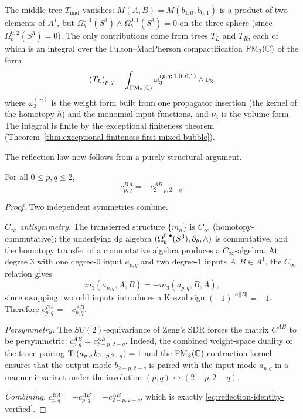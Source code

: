 The middle tree $T_{\mathrm{mid}}$ vanishes: $M(A,B)=M(b_{1,0},b_{0,1})$ is a product of
two elements of $A^1$, but $\Omega_b^{0,1}(S^3)\wedge\Omega_b^{0,1}(S^3)=0$ on the
three-sphere (since $\Omega_b^{0,2}(S^3)=0$). The only contributions come from trees
$T_L$ and $T_R$, each of which is an integral over the Fulton--MacPherson compactification
$\mathrm{FM}_3(\mathbb C)$ of the form
\begin{equation}
\label{eq:fm3-cubic-integral}
(T_L)_{p,q}
=
\int_{\mathrm{FM}_3(\mathbb C)}
\omega^{(p,q;\,1,0;\,0,1)}_3\wedge\nu_3,
\end{equation}
where $\omega^{(\cdots)}_3$ is the weight form built from one propagator insertion
(the kernel of the homotopy $h$) and the monomial input functions, and $\nu_3$ is
the volume form. The integral is finite by the exceptional finiteness theorem
(Theorem~\ref{thm:exceptional-finiteness-first-mixed-bubble}).

The reflection law now follows from a purely structural argument.

\begin{theorem}
\label{thm:mixed-cubic-reflection}
For all $0\le p,q\le 2$,
\begin{equation}
\label{eq:reflection-identity-verified}
c^{BA}_{p,q}=-c^{AB}_{2-p,2-q}.
\end{equation}
\end{theorem}

\begin{proof}
Two independent symmetries combine.

\emph{$C_\infty$ antisymmetry.}
The transferred structure $\{m_n\}$ is $C_\infty$
(homotopy-commutative): the underlying dg algebra
$(\Omega_b^{0,\bullet}(S^3),\bar\partial_b,\wedge)$ is commutative, and the homotopy transfer of
a commutative algebra produces a $C_\infty$-algebra. At degree $3$ with one degree-$0$
input $a_{p,q}$ and two degree-$1$ inputs $A,B\in A^1$, the $C_\infty$ relation gives
\begin{equation}
\label{eq:cinf-antisymmetry}
m_3(a_{p,q},A,B)=-m_3(a_{p,q},B,A),
\end{equation}
since swapping two odd inputs introduces a Koszul sign $(-1)^{|A||B|}=-1$.
Therefore $c^{BA}_{p,q}=-c^{AB}_{p,q}$.

\emph{Persymmetry.}
The $SU(2)$-equivariance of Zeng's SDR forces the matrix $C^{AB}$ to be persymmetric:
$c^{AB}_{p,q}=c^{AB}_{2-p,2-q}$. Indeed, the combined weight-space duality of the trace
pairing $\operatorname{Tr}(a_{p,q}\,b_{2-p,2-q})=1$ and the FM$_3(\mathbb C)$ contraction kernel ensures that
the output mode $b_{2-p,2-q}$ is paired with the input mode $a_{p,q}$ in a manner invariant
under the involution $(p,q)\leftrightarrow(2-p,2-q)$.

\emph{Combining.}
$c^{BA}_{p,q}=-c^{AB}_{p,q}=-c^{AB}_{2-p,2-q}$,
which is exactly \eqref{eq:reflection-identity-verified}.
\end{proof}

